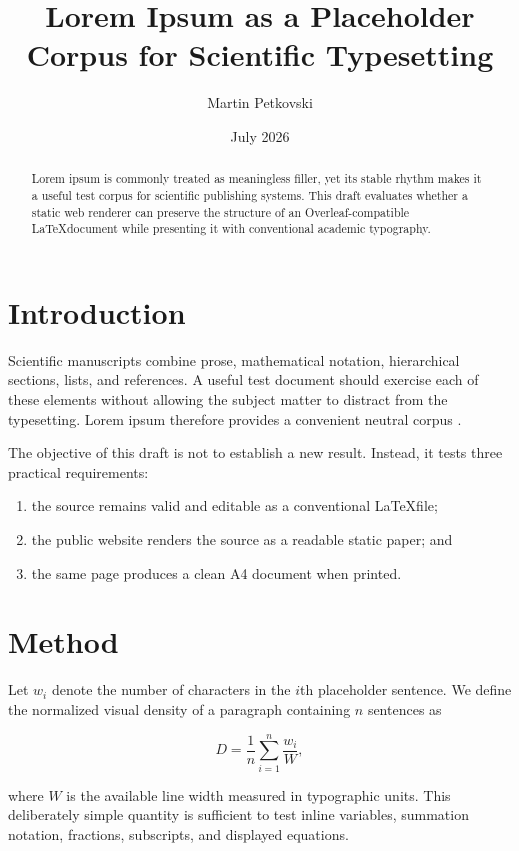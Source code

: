 \documentclass[11pt,a4paper]{article}
\title{Lorem Ipsum as a Placeholder Corpus for Scientific Typesetting}
\author{Martin Petkovski}
\date{July 2026}
\begin{document}
\maketitle

\begin{abstract}
Lorem ipsum is commonly treated as meaningless filler, yet its stable rhythm makes it a useful test corpus for scientific publishing systems. This draft evaluates whether a static web renderer can preserve the structure of an Overleaf-compatible \LaTeX document while presenting it with conventional academic typography.
\end{abstract}

\section{Introduction}

Scientific manuscripts combine prose, mathematical notation, hierarchical sections, lists, and references. A useful test document should exercise each of these elements without allowing the subject matter to distract from the typesetting. Lorem ipsum therefore provides a convenient neutral corpus \cite{cicero45}.

The objective of this draft is not to establish a new result. Instead, it tests three practical requirements:

\begin{enumerate}
\item the source remains valid and editable as a conventional \LaTeX file;
\item the public website renders the source as a readable static paper; and
\item the same page produces a clean A4 document when printed.
\end{enumerate}

\section{Method}

Let $w_i$ denote the number of characters in the $i$th placeholder sentence. We define the normalized visual density of a paragraph containing $n$ sentences as

\begin{equation}
D = \frac{1}{n}\sum_{i=1}^{n}\frac{w_i}{W},
\label{eq:density}
\end{equation}

where $W$ is the available line width measured in typographic units. This deliberately simple quantity is sufficient to test inline variables, summation notation, fractions, subscripts, and displayed equations.
\end{document}
